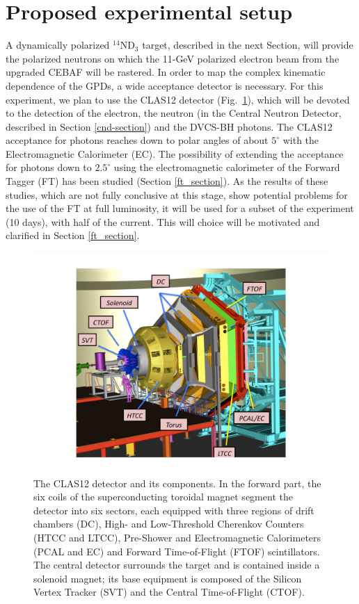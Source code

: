 \section{Proposed experimental setup}\label{setup-section}
A dynamically polarized ${}^{14}$ND$_3$ target, described in the next Section, will provide the polarized neutrons on which the 11-GeV polarized electron beam from the upgraded CEBAF will be rastered.
In order to map the complex kinematic dependence of the GPDs, a wide acceptance detector is necessary. For this experiment, we plan to use the CLAS12 detector (Fig.~\ref{clas12}), which will be devoted to the detection of the electron, the neutron (in the Central Neutron Detector, described in Section \ref{cnd-section}) and the DVCS-BH photons. The CLAS12 acceptance for photons reaches down to polar angles of about $5^{\circ}$ with the Electromagnetic Calorimeter (EC). 
The possibility of extending the acceptance for photons down to $2.5^{\circ}$ using the electromagnetic calorimeter of the Forward Tagger (FT) \cite{batta} has been studied (Section \ref{ft_section}). As the results of these studies, which are not fully conclusive at this stage, show potential problems for the use of the FT at full luminosity, it will be used for a subset of the experiment (10 days), with half of the current. This will choice will be motivated and clarified in Section \ref{ft_section}. 
\begin{figure}
\begin{center}
\includegraphics[width=130mm]{clas12-design.pdf}
\caption [The CLAS12 detector and its components]
{The CLAS12 detector and its components. In the forward part, the six coils of the superconducting toroidal magnet segment the detector into six sectors, each equipped with three regions of drift chambers (DC), High- and Low-Threshold Cherenkov Counters (HTCC and LTCC), Pre-Shower and Electromagnetic Calorimeters (PCAL and EC) and Forward Time-of-Flight (FTOF) scintillators. The central detector surrounds the target and is contained inside a solenoid magnet; its base equipment is composed of the Silicon Vertex Tracker (SVT) and the Central Time-of-Flight (CTOF).}
\label{clas12}
\end{center}
\end{figure}
